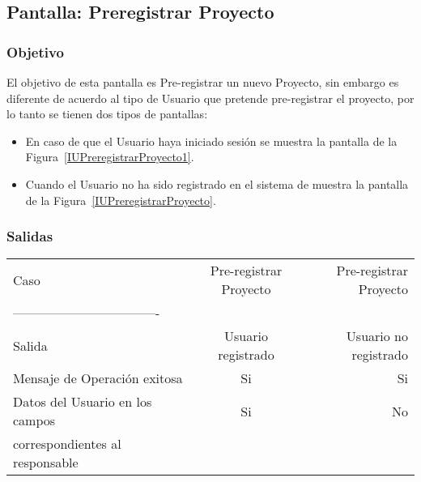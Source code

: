 \subsection{Pantalla: Preregistrar Proyecto}

\subsubsection{Objetivo}
El objetivo de esta pantalla es Pre-registrar un nuevo Proyecto, sin embargo es diferente de acuerdo al tipo de Usuario que pretende pre-registrar el proyecto, por lo tanto se tienen dos tipos de pantallas:
\begin{itemize}
 \item En caso de que el Usuario haya iniciado sesión se muestra la pantalla de la Figura~\ref{IUPreregistrarProyecto1}.
 \item Cuando el Usuario no ha sido registrado en el sistema de muestra la pantalla de la Figura~\ref{IUPreregistrarProyecto}.
\end{itemize}


\subsubsection{Salidas}

\begin{center}
   \begin{tabular}{| l | c | r | }
     \hline
       Caso & Pre-registrar Proyecto & Pre-registrar Proyecto \\
     ---------------------------------- &  & \\
     Salida & Usuario registrado & Usuario no registrado \\ \hline
     Mensaje de Operación exitosa & Si & Si \\ \hline
     Datos del Usuario en los campos & Si & No \\
     correspondientes al responsable & & \\
     \hline
   \end{tabular}
 \end{center}

